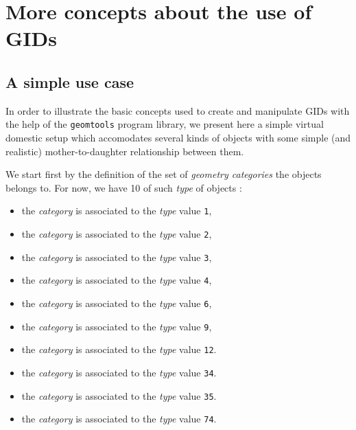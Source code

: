 
\section{More concepts about the use of GIDs}

\subsection{A simple use case}

\pn  In order  to illustrate  the basic  concepts used  to  create and
manipulate  GIDs  with  the  help of  the  \texttt{geomtools}  program
library,  we  present  here  a  simple virtual  domestic  setup  which
accomodates several kinds of  objects with some simple (and realistic)
mother-to-daughter relationship between them.

\pn  We start first  by the  definition of  the set  of \emph{geometry
  categories}  the objects belongs  to.  For  now, we  have 10  of such
\emph{type} of objects :

\begin{itemize}
  
\item the \emph{category}  is associated to the \emph{type}
  value \texttt{1},
  
\item the \emph{category}  is associated to the \emph{type}
  value \texttt{2},
  
\item the \emph{category}  is associated to the \emph{type}
  value \texttt{3},
 
\item the \emph{category}  is associated to the \emph{type}
  value \texttt{4},
  
\item the \emph{category}  is associated to the \emph{type}
  value \texttt{6},
   
\item the \emph{category}  is associated to the \emph{type}
  value \texttt{9},
  
\item the \emph{category}  is associated to the \emph{type}
  value \texttt{12}.
  
\item the \emph{category}  is associated to the \emph{type}
  value \texttt{34}.
  
\item the \emph{category}  is associated to the \emph{type}
  value \texttt{35}.
  
\item the \emph{category}  is associated to the \emph{type}
  value \texttt{74}.
  
\end{itemize}

